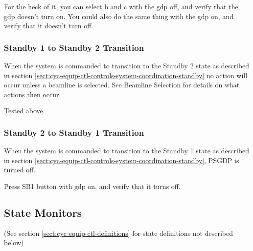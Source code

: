 \documentclass[11pt]{book}		%
\begin{document}
For the heck of it, you can select b and c with the gdp off, and verify that the gdp doesn't turn on. You could also do the same thing with the gdp on, and verify that it doesn't turn off.

\color{black}


\subsubsection{Standby 1 to Standby 2 Transition}

When the system is commanded to transition to the Standby 2 state as described in section \ref{sect:cyc-equip-ctl-controls-system-coordination-standby} no action will occur unless a beamline is selected. See Beamline Selection for details on what actions then occur.

\color{red}

Tested above.

\color{black}

\subsubsection{Standby 2 to Standby 1 Transition}

When the system is commanded to transition to the Standby 1 state as described in section \ref{sect:cyc-equip-ctl-controls-system-coordination-standby}, PSGDP is turned off.

\color{red}

Press SB1 button with gdp on, and verify that it turns off.

\color{black}


\subsection{State Monitors} \label{sect:cyc-equip-ctl-beamline-gdp-state-monitors}
(See section \ref{sect:cyc-equip-ctl-definitions} for state definitions not described below)
\end{document}
